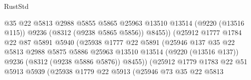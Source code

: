 \begin{lexlean}{RustStd}
\begin{coremodule}
                                        @35
                                        @22
                                        @5813
                                        @2988
                                        @5855
                                        @5865
                                        @25963
                                        @13510
                                        @13514
                                        (@9220 (@13516 @115))
                                        @9236
                                        (@8312 (@9238 @5865 @5856))
                                        @8455))
                                    (@25912
                                      @1777
                                      @1784
                                      @22
                                      @87
                                      @5891
                                      @5940
                                      (@25938
                                        @1777
                                        @22
                                        @5891
                                        (@25946
                                          @137
                                          @35
                                          @22
                                          @5813
                                          @2988
                                          @5875
                                          @5886
                                          @25963
                                          @13510
                                          @13514
                                          (@9220 (@13516 @137))
                                          @9236
                                          (@8312 (@9238 @5886 @5876))
                                          @8455))
                                      (@25912
                                        @1779
                                        @1783
                                        @22
                                        @51
                                        @5913
                                        @5939
                                        (@25938
                                          @1779
                                          @22
                                          @5913
                                          (@25946
                                            @73
                                            @35
                                            @22
                                            @5813

\end{coremodule}
\end{lexlean}
